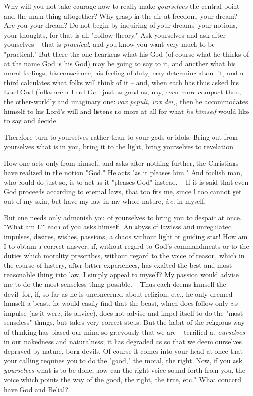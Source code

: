\documentclass[a4paper]{book}
\begin{document}
Why will you not take courage now to really make \textit{yourselves} the 
central point and the main thing altogether? Why grasp in the air at freedom, 
your dream? Are you your dream? Do not begin by inquiring of your dreams, your 
notions, your thoughts, for that is all "{}hollow theory."{} Ask yourselves 
and ask after yourselves -- that is \textit{practical}, and you know you want 
very much to be "{}practical."{} But there the one hearkens what his God (of 
course what he thinks of at the name God is his God) may be going to say to 
it, and another what his moral feelings, his conscience, his feeling of duty, 
may determine about it, and a third calculates what folks will think of it -- 
and, when each has thus asked his Lord God (folks are a Lord God just as good 
as, nay, even more compact than, the other-worldly and imaginary one: 
\textit{vox populi, vox dei)}, then he accommodates himself to his Lord's will 
and listens no more at all for what \textit{he himself} would like to say and 
decide.

Therefore turn to yourselves rather than to your gods or idols. Bring out from 
yourselves what is in you, bring it to the light, bring yourselves to 
revelation.

How one acts only from himself, and asks after nothing further, the Christians 
have realized in the notion "{}God."{} He acts "{}as it pleases him."{} And 
foolish man, who could do just so, is to act as it "{}pleases God"{} instead. 
-- If it is said that even God proceeds according to eternal laws, that too 
fits me, since I too cannot get out of my skin, but have my law in my whole 
nature, \textit{i.e.} in myself.

But one needs only admonish you of yourselves to bring you to despair at once. 
"{}What am I?"{} each of you asks himself. An abyss of lawless and unregulated 
impulses, desires, wishes, passions, a chaos without light or guiding star! 
How am I to obtain a correct answer, if, without regard to God's commandments 
or to the duties which morality prescribes, without regard to the voice of 
reason, which in the course of history, after bitter experiences, has exalted 
the best and most reasonable thing into law, I simply appeal to myself? My 
passion would advise me to do the most senseless thing possible. -- Thus each 
deems himself the -- devil; for, if, so far as he is unconcerned about 
religion, etc., he only deemed himself a beast, he would easily find that the 
beast, which does follow only \textit{its} impulse (as it were, its advice), 
does not advise and impel itself to do the "{}most senseless"{} things, but 
takes very correct steps. But the habit of the religious way of thinking has 
biased our mind so grievously that we are -- terrified at \textit{ourselves} 
in our nakedness and naturalness; it has degraded us so that we deem ourselves 
depraved by nature, born devils. Of course it comes into your head at once 
that your calling requires you to do the "{}good,"{} the moral, the right. 
Now, if you ask \textit{yourselves} what is to be done, how can the right 
voice sound forth from you, the voice which points the way of the good, the 
right, the true, etc.? What concord have God and Belial?
\end{document}
